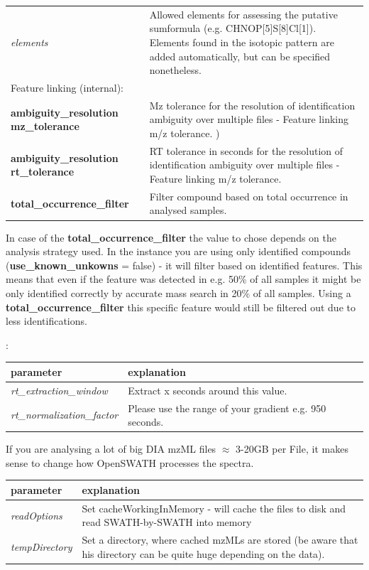 \begin{center}
\begin{tabular*}{\textwidth}{ p{5.5cm}|p{10.5cm} }
\textit{elements} & Allowed elements for assessing the putative sumformula (e.g. CHNOP[5]S[8]Cl[1]). Elements found in the isotopic pattern are added automatically, but can be specified nonetheless. \\
Feature linking (internal): & \\
\textbf{ambiguity\_resolution mz\_tolerance} & Mz tolerance for the resolution of identification ambiguity over multiple files - Feature linking m/z tolerance. ) \\
\textbf{ambiguity\_resolution rt\_tolerance} & RT tolerance in seconds for the resolution of identification ambiguity over multiple files - Feature linking m/z tolerance. \\
\textbf{total\_occurrence\_filter} & Filter compound based on total occurrence in analysed samples.\\
\end{tabular*}
\end{center}

\noindent In case of the \textbf{total\_occurrence\_filter} the value to chose depends on the analysis strategy used. In the instance you are using only identified compounds (\textbf{use\_known\_unkowns} = false) - it will filter based on identified features. This means that even if the feature was detected in e.g. 50\% of all samples it might be only identified correctly by accurate mass search in 20\% of all samples. Using a \textbf{total\_occurrence\_filter} this specific feature would still be filtered out  due to less identifications. 

\noindent{}:
\begin{center}
\begin{tabular*}{\textwidth}{ p{5.5cm}|p{10.5cm} }
\textbf{parameter} & \textbf{explanation} \\ \hline
\textit{rt\_extraction\_window} & Extract x seconds around this value. \\
\textit{rt\_normalization\_factor} &  Please use the range of your gradient e.g. 950 seconds. \\
\end{tabular*}
\end{center} 

\noindent If you are analysing a lot of big DIA mzML files $\approx$ 3-20GB per File, it makes sense to change how OpenSWATH processes the spectra. 

\begin{center}
\begin{tabular*}{\textwidth}{ p{5.5cm}|p{10.5cm} }
\textbf{parameter} & \textbf{explanation} \\ \hline
\textit{readOptions} & Set cacheWorkingInMemory - will cache the files to disk and read SWATH-by-SWATH into memory\\
\textit{tempDirectory} &  Set a directory, where cached mzMLs are stored (be aware that his directory can be quite huge depending on the data). \\
\end{tabular*}
\end{center} 


